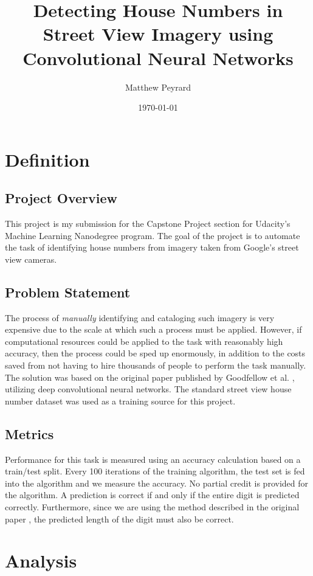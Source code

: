\documentclass[12pt]{article}
\title{Detecting House Numbers in Street View Imagery using Convolutional Neural Networks}
\author{Matthew Peyrard}
\date{\today}
\begin{document}
\maketitle

\section{Definition}
\subsection{Project Overview}
This project is my submission for the Capstone Project section for Udacity's Machine Learning Nanodegree program.
The goal of the project is to automate the task of identifying house numbers from imagery taken from Google's street view cameras.


\subsection{Problem Statement}
The process of \textit{manually} identifying and cataloging such imagery is very expensive due to the scale at which such a process must be applied.
However, if computational resources could be applied to the task with reasonably high accuracy, then the process could be sped up enormously, in addition to the costs saved from not having to hire thousands of people to perform the task manually.
The solution was based on the original paper published by Goodfellow et al. \cite{svhn_original_paper}, utilizing deep convolutional neural networks. 
The standard street view house number dataset \cite{svhn_dataset} was used as a training source for this project.

\subsection{Metrics}
Performance for this task is measured using an accuracy calculation based on a train/test split. 
Every 100 iterations of the training algorithm, the test set is fed into the algorithm and we measure the accuracy. 
No partial credit is provided for the algorithm. 
A prediction is correct if and only if the entire digit is predicted correctly. 
Furthermore, since we are using the method described in the original paper \cite{svhn_original_paper}, the predicted length of the digit must also be correct. 

\section{Analysis}
\end{document}
